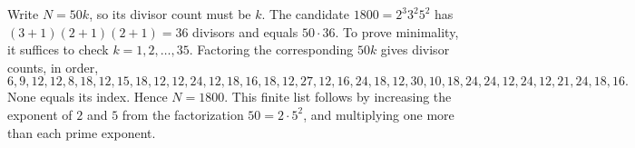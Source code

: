 Write $N=50k$, so its divisor count must be $k$. The candidate $1800=2^3 3^2 5^2$ has $(3+1)(2+1)(2+1)=36$ divisors and equals $50\cdot36$. To prove minimality, it suffices to check $k=1,2,\ldots,35$. Factoring the corresponding $50k$ gives divisor counts, in order,\[6,9,12,12,8,18,12,15,18,12,12,24,12,18,16,18,12,27,12,16,24,18,12,30,10,18,24,24,12,24,12,21,24,18,16.\]None equals its index. Hence $\boxed{N=1800}$. This finite list follows by increasing the exponent of $2$ and $5$ from the factorization $50=2\cdot5^2$, and multiplying one more than each prime exponent.
